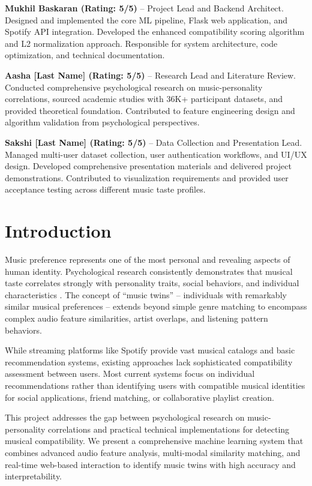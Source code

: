 \documentclass[conference]{IEEEtran}
\begin{document}
\textbf{Mukhil Baskaran (Rating: 5/5)} -- Project Lead and Backend Architect. Designed and implemented the core ML pipeline, Flask web application, and Spotify API integration. Developed the enhanced compatibility scoring algorithm and L2 normalization approach. Responsible for system architecture, code optimization, and technical documentation.

\textbf{Aasha [Last Name] (Rating: 5/5)} -- Research Lead and Literature Review. Conducted comprehensive psychological research on music-personality correlations, sourced academic studies with 36K+ participant datasets, and provided theoretical foundation. Contributed to feature engineering design and algorithm validation from psychological perspectives.

\textbf{Sakshi [Last Name] (Rating: 5/5)} -- Data Collection and Presentation Lead. Managed multi-user dataset collection, user authentication workflows, and UI/UX design. Developed comprehensive presentation materials and delivered project demonstrations. Contributed to visualization requirements and provided user acceptance testing across different music taste profiles.

\section{Introduction}

Music preference represents one of the most personal and revealing aspects of human identity. Psychological research consistently demonstrates that musical taste correlates strongly with personality traits, social behaviors, and individual characteristics \cite{rentfrow2008music}. The concept of ``music twins'' -- individuals with remarkably similar musical preferences -- extends beyond simple genre matching to encompass complex audio feature similarities, artist overlaps, and listening pattern behaviors.

While streaming platforms like Spotify provide vast musical catalogs and basic recommendation systems, existing approaches lack sophisticated compatibility assessment between users. Most current systems focus on individual recommendations rather than identifying users with compatible musical identities for social applications, friend matching, or collaborative playlist creation.

This project addresses the gap between psychological research on music-personality correlations and practical technical implementations for detecting musical compatibility. We present a comprehensive machine learning system that combines advanced audio feature analysis, multi-modal similarity matching, and real-time web-based interaction to identify music twins with high accuracy and interpretability.
\end{document}
